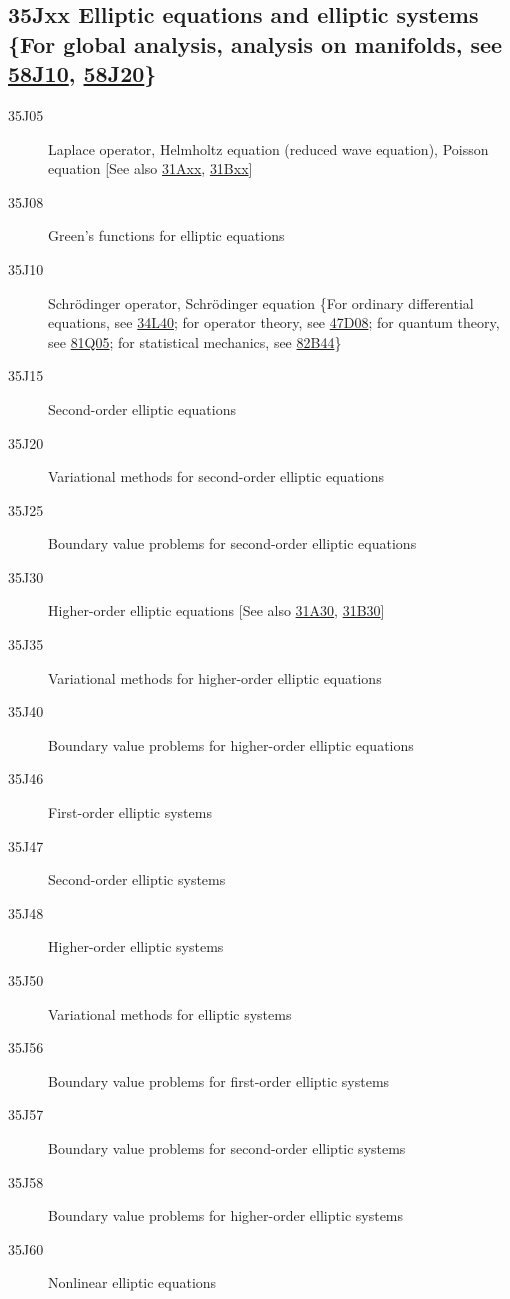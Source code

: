 \subsection*{35Jxx  Elliptic equations  and elliptic systems \{For global analysis, analysis on manifolds, see  \hyperref[58J10]{58J10}, \hyperref[58J20]{58J20}\} }\label{35Jxx}
\begin{description}  
\item [35J05]\label{35J05} Laplace operator,  Helmholtz equation  (reduced wave equation), Poisson equation [See also \hyperref[31Axx]{31Axx}, \hyperref[31Bxx]{31Bxx}]
\item [35J08]\label{35J08} Green's functions for elliptic equations
\item [35J10]\label{35J10} Schr\"{o}dinger operator, Schr\"{o}dinger equation  \{For ordinary differential equations, see \hyperref[34L40]{34L40}; for operator theory, see \hyperref[47D08]{47D08}; for quantum theory, see \hyperref[81Q05]{81Q05}; for statistical mechanics, see \hyperref[82B44]{82B44}\}
\item [35J15]\label{35J15} Second-order elliptic equations 
\item [35J20]\label{35J20} Variational methods for second-order elliptic equations
\item [35J25]\label{35J25} Boundary value problems for second-order elliptic equations
\item [35J30]\label{35J30} Higher-order elliptic equations [See also \hyperref[31A30]{31A30}, \hyperref[31B30]{31B30}]
\item [35J35]\label{35J35} Variational methods for higher-order elliptic equations
\item [35J40]\label{35J40} Boundary value problems for higher-order elliptic equations
\item [35J46]\label{35J46} First-order elliptic systems 
\item [35J47]\label{35J47} Second-order elliptic systems
\item [35J48]\label{35J48} Higher-order elliptic systems 
\item [35J50]\label{35J50} Variational methods for elliptic systems 
\item [35J56]\label{35J56} Boundary value problems for first-order elliptic systems 
\item [35J57]\label{35J57} Boundary value problems for second-order elliptic systems 
\item [35J58]\label{35J58} Boundary value problems for higher-order elliptic systems 
\item [35J60]\label{35J60} Nonlinear elliptic equations 

\end{description}
